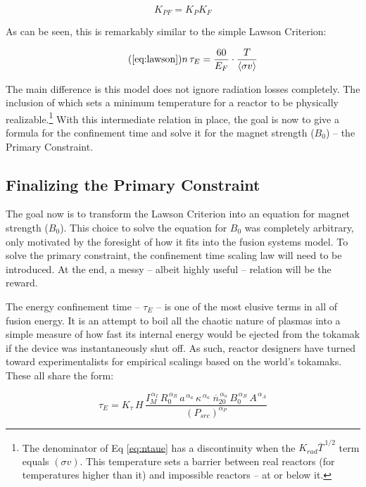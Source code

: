 \begin{equation}
	K_{PF} = K_P K_F
\end{equation}

As can be seen, this is remarkably similar to the simple Lawson Criterion:

\begin{equation}
	\tag{\ref{eq:lawson}}
	n \, \tau_E = \frac{ 60 }{ E_F } \cdot \frac{ T }{ \langle \sigma v \rangle }
\end{equation} 

The main difference is this model does not ignore radiation losses completely. The inclusion of which sets a minimum temperature for a reactor to be physically realizable.\footnote{ The denominator of Eq \ref{eq:ntaue} has a discontinuity when the $K_{rad} \overline T ^ {\,1/2}$ term equals $( \sigma v )$. This temperature sets a barrier between real reactors (for temperatures higher than it) and impossible reactors -- at or below it.} With this intermediate relation in place, the goal is now to give a formula for the confinement time and solve it for the magnet strength ($B_0$) -- the Primary Constraint.

\subsection{Finalizing the Primary Constraint}

The goal now is to transform the Lawson Criterion into an equation for magnet strength ($B_0$). This choice to solve the equation for $B_0$ was completely arbitrary, only motivated by the foresight of how it fits into the fusion systems model. To solve the primary constraint, the confinement time scaling law will need to be introduced. At the end, a messy -- albeit highly useful -- relation will be the reward.

The energy confinement time -- $\tau_E$ -- is one of the most elusive terms in all of fusion energy. It is an attempt to boil all the chaotic nature of plasmas into a simple measure of how fast its internal energy would be ejected from the tokamak if the device was instantaneously shut off. As such, reactor designers have turned toward experimentalists for empirical scalings based on the world's tokamaks. These all share the form:

\begin{equation}
	\tau_E = K_\tau \, H \, \frac{
		I_M^{\,\alpha_I} \, R_0^{\,\alpha_R} \, a^{\,\alpha_a} \, \kappa^{\,\alpha_\kappa} \ \overline{n}_{20}^{\,\alpha_n} \, B_0^{\,\alpha_B} \, A^{\,\alpha_A}
	}{ ( P_{src} ) ^ {\alpha_P} }
\end{equation}

